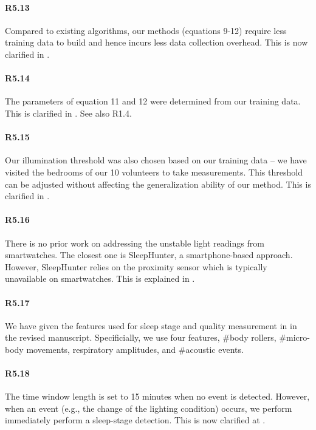 \paragraph{R5.13} Compared to existing algorithms, our methods (equations 9-12) require less training data to build and hence incurs less data collection overhead. This is now clarified in .

\paragraph{R5.14} The parameters of equation 11 and 12 were determined from our training data. This is clarified in . See also R1.4.

\paragraph{R5.15} Our illumination threshold was also chosen based on our training data -- we have visited the bedrooms of our 10 volunteers
to take measurements. This threshold can be adjusted without affecting the generalization ability of our method. This is clarified in
.

\paragraph{R5.16} There is no prior work on addressing the unstable light readings from smartwatches. The closest one is SleepHunter, a
smartphone-based approach. However, SleepHunter relies on the proximity sensor which is typically unavailable on smartwatches. This is
explained in .

\paragraph{R5.17} We have given the features used for sleep stage and quality measurement in  in the revised manuscript.
Specificially, we use four features, \#body rollers, \#micro-body movements, respiratory amplitudes, and \#acoustic events.

\paragraph{R5.18} The time window length is set to 15 minutes when no event is detected. However, when an event (e.g., the change of the
lighting condition) occurs, we perform immediately perform a sleep-stage detection. This is now clarified at .

